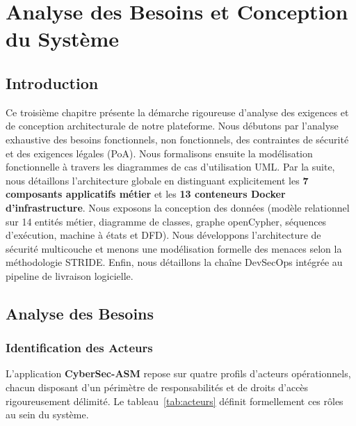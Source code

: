 \chapter{Analyse des Besoins et Conception du Syst\`eme}
\label{chap:conception}

\section*{Introduction}
\par Ce troisi\`eme chapitre pr\'esente la d\'emarche rigoureuse d'analyse des exigences et de conception architecturale de notre plateforme. Nous d\'ebutons par l'analyse exhaustive des besoins fonctionnels, non fonctionnels, des contraintes de s\'ecurit\'e et des exigences l\'egales (PoA). Nous formalisons ensuite la mod\'elisation fonctionnelle \`a travers les diagrammes de cas d'utilisation UML. Par la suite, nous d\'etaillons l'architecture globale en distinguant explicitement les \textbf{7 composants applicatifs m\'etier} et les \textbf{13 conteneurs Docker d'infrastructure}. Nous exposons la conception des donn\'ees (mod\`ele relationnel sur 14 entit\'es m\'etier, diagramme de classes, graphe openCypher, s\'equences d'ex\'ecution, machine \`a \'etats et DFD). Nous d\'eveloppons l'architecture de s\'ecurit\'e multicouche et menons une mod\'elisation formelle des menaces selon la m\'ethodologie STRIDE. Enfin, nous d\'etaillons la cha\^ine DevSecOps int\'egr\'ee au pipeline de livraison logicielle.

\section{Analyse des Besoins}
\subsection{Identification des Acteurs}
\par L'application \textbf{CyberSec-ASM} repose sur quatre profils d'acteurs op\'erationnels, chacun disposant d'un p\'erim\`etre de responsabilit\'es et de droits d'acc\`es rigoureusement d\'elimit\'e. Le tableau~\ref{tab:acteurs} d\'efinit formellement ces r\^oles au sein du syst\`eme.

